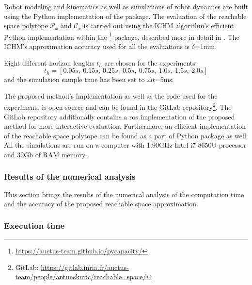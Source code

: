 Robot modeling and kinematics as well as simulations of robot dynamics are built using the Python implementation of the  \cite{rtb} package. 
The evaluation of the reachable space polytope $\mathcal{P}_x$ and $\mathcal{C}_x$ is carried out using the ICHM algorithm's efficient Python implementation within the \footnote{\url{https://auctus-team.github.io/pycapacity/}} package, described more in detail in . The ICHM's approximation accuracy used for all the evaluations is $\delta$=1mm.

Eight different horizon lengths $t_h$ are chosen for the experiments
$$
t_h = [0.05s, ~ 0.15s, ~ 0.25s, ~ 0.5s,~ 0.75s,~ 1.0s,~ 1.5s, ~ 2.0s]
$$
and the simulation sample time has been set to $\Delta t$=5ms. 

The proposed method's implementation as well as the code used for the experiments is open-source and can be found in the GitLab repository\footnote{GitLab: \url{https://gitlab.inria.fr/auctus-team/people/antunskuric/reachable_space/}}. The GitLab repository additionally contains a \gls{ros} \cite{ros} implementation of the proposed method for more interactive evaluation. Furthermore, an efficient implementation of the reachable space polytope can be found as a part of  Python package as well. All the simulations are run on a computer with 1.90GHz Intel i7-8650U processor and 32Gb of RAM memory.
 
\subsubsection{Results of the numerical analysis}
\label{ch:results}

This section brings the results of the numerical analysis of the computation time and the accuracy of the proposed reachable space approximation.

\subsubsection*{Execution time}

